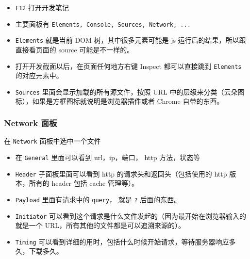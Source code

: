 

\begin{issues}
\issueDraft
\end{issues}

\begin{itemize}
\item \verb`F12` 打开开发笔记
\item 主要面板有 \verb`Elements, Console, Sources, Network, ...`
\item \verb`Elements` 就是当前 DOM 树，其中很多元素可能是 js 运行后的结果，所以跟直接看页面的 source 可能是不一样的。
\item 打开开发截面以后，在页面任何地方右键 Inspect 都可以直接跳到 \verb`Elements` 的对应元素中。
\item \verb`Sources` 里面会显示加载的所有源文件，按照 URL 中的层级来分类（云朵图标），如果是方框图标就说明是浏览器插件或者 Chrome 自带的东西。
\end{itemize}

\subsubsection{Network 面板}
在 \verb`Network` 面板中选中一个文件
\begin{itemize}
\item 在 \verb`General` 里面可以看到 url，ip，端口， http 方法，状态等
\item \verb`Header` 子面板里面可以看到 http 的请求头和返回头（包括使用的 http 版本，所有的 header 包括 cache 管理等）。
\item \verb`Payload` 里面有请求中的 \verb`query`， 就是 \verb`?` 后面的东西。
\item \verb`Initiator` 可以看到这个请求是什么文件发起的（因为最开始在浏览器输入的就是一个 URL，所有其他的文件都是可以追溯来源的）。
\item \verb`Timing` 可以看到详细的用时，包括什么时候开始请求，等待服务器响应多久，下载多久。
\end{itemize}
